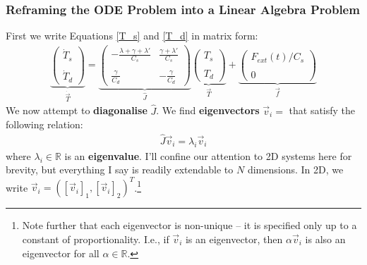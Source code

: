 \subsubsection{Reframing the ODE Problem into a Linear Algebra Problem}
First we write Equations \ref{T_s} and \ref{T_d} in matrix form:
\begin{align}
    \label{T Matrix}
    \underbrace{\left( \begin{array}{c}
        \dot{T}_s \\\\ \dot{T}_d
    \end{array} 
    \right)}_{\dot{\vec{T}}}
    =
    \underbrace{\left( \begin{array}{cc}
        -\frac{\lambda+\gamma+\lambda'}{C_s} & \frac{\gamma+\lambda'}{C_s} \\\\
        \frac{\gamma}{C_d} & -\frac{\gamma}{C_d}
    \end{array}
    \right)}_{\hat{J}}
    \underbrace{\left(  \begin{array}{c}
        T_s \\\\ T_d
    \end{array}
    \right)}_{\vec{T}}
    +
    \underbrace{\left( \begin{array}{c}
        F_{ext}(t)/C_s \\\\ 0
    \end{array}
    \right)}_{\vec{f}}
\end{align}
We now attempt to \textbf{diagonalise} $\hat{J}$. We find \textbf{eigenvectors} $\vec{v}_i=$ that satisfy the following relation:
\begin{align}
    \label{Eigenequation}
    \hat{J}\vec{v}_i=\lambda_i\vec{v}_i
\end{align}
where $\lambda_i\in\mathbb{R}$ is an \textbf{eigenvalue}. I'll confine our attention to 2D systems here for brevity, but everything I say is readily extendable to $N$ dimensions. In 2D, we write $\vec{v}_i=([\vec{v}_i]_1,[\vec{v}_i]_2)^T$.\footnote{Note further that each eigenvector is non-unique – it is specified only up to a constant of proportionality. I.e., if $\vec{v}_i$ is an eigenvector, then $\alpha\vec{v}_i$ is also an eigenvector for all $\alpha \in \mathbb{R}$.}


